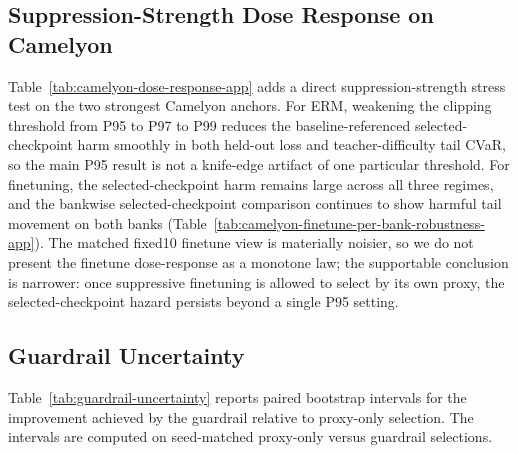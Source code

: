 \subsection{Suppression-Strength Dose Response on Camelyon}
\label{app:camelyon-dose-response}
Table~\ref{tab:camelyon-dose-response-app} adds a direct suppression-strength stress test on the two strongest Camelyon anchors.
For ERM, weakening the clipping threshold from P95 to P97 to P99 reduces the baseline-referenced selected-checkpoint harm smoothly in both held-out loss and teacher-difficulty tail CVaR, so the main P95 result is not a knife-edge artifact of one particular threshold.
For finetuning, the selected-checkpoint harm remains large across all three regimes, and the bankwise selected-checkpoint comparison continues to show harmful tail movement on both banks (Table~\ref{tab:camelyon-finetune-per-bank-robustness-app}).
The matched fixed10 finetune view is materially noisier, so we do not present the finetune dose-response as a monotone law; the supportable conclusion is narrower: once suppressive finetuning is allowed to select by its own proxy, the selected-checkpoint hazard persists beyond a single P95 setting.

\begin{table}[h]
  \centering
  \small
  \resizebox{\columnwidth}{!}{}
  \caption{
    Camelyon suppression-strength dose response on the selected checkpoints.
    Frac clip reports the mean validation clipping fraction at the selected epoch.
    In the baseline-referenced selected-checkpoint workflow view, ERM loss / tail harm weakens as clipping relaxes from P95 to P97 to P99.
    Table~\ref{tab:camelyon-erm-selector-dose} separately reports the same-trajectory selector-dose diagnostic.
    On finetuning, the selected-checkpoint hazard remains large across all three tested clipping thresholds, so P95 should be read as the designated strong stress-test setting rather than as a unique knife-edge.
  }
  \label{tab:camelyon-dose-response-app}
\end{table}

\subsection{Guardrail Uncertainty}
\label{app:guardrail}
Table~\ref{tab:guardrail-uncertainty} reports paired bootstrap intervals for the improvement achieved by the guardrail relative to proxy-only selection.
The intervals are computed on seed-matched proxy-only versus guardrail selections.

